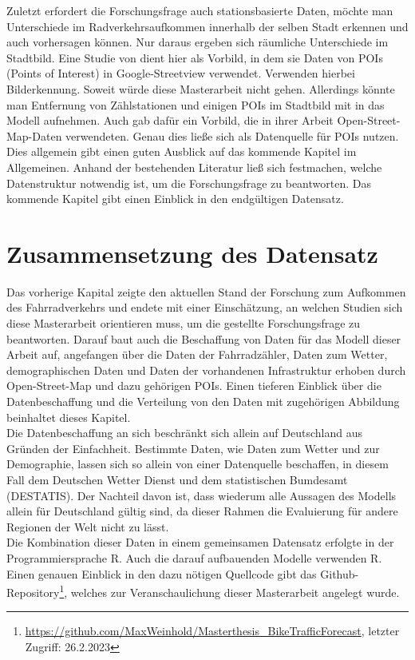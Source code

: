 \documentclass[a4paper,12pt]{thesis}
\begin{document}
Zuletzt erfordert die Forschungsfrage auch stationsbasierte Daten, möchte man Unterschiede im Radverkehrsaufkommen innerhalb der selben Stadt erkennen und auch vorhersagen können. Nur daraus ergeben sich räumliche Unterschiede im Stadtbild. Eine Studie von \cite{HANKEY2021102651} dient hier als Vorbild, in dem sie Daten von POIs (Points of Interest) in Google-Streetview verwendet. \cite{HANKEY2021102651} Verwenden hierbei Bilderkennung. Soweit würde diese Masterarbeit nicht gehen. Allerdings könnte man Entfernung von Zählstationen und einigen POIs im Stadtbild mit in das Modell aufnehmen. Auch \cite{Alattar2021} gab dafür ein Vorbild, die in ihrer Arbeit Open-Street-Map-Daten verwendeten. Genau dies ließe sich als Datenquelle für POIs nutzen. Dies allgemein gibt einen guten Ausblick auf das kommende Kapitel im Allgemeinen. Anhand der bestehenden Literatur ließ sich festmachen, welche Datenstruktur notwendig ist, um die Forschungsfrage zu beantworten. Das kommende Kapitel gibt einen Einblick in den endgültigen Datensatz.

\chapter{Zusammensetzung des Datensatz}\label{Datensatz}

Das vorherige Kapital zeigte den aktuellen Stand der Forschung zum Aufkommen des Fahrradverkehrs und endete mit einer Einschätzung, an welchen Studien sich diese Masterarbeit orientieren muss, um die gestellte Forschungsfrage zu beantworten. Darauf baut auch die Beschaffung von Daten für das Modell dieser Arbeit auf, angefangen über die Daten der Fahrradzähler, Daten zum Wetter, demographischen Daten und Daten der vorhandenen Infrastruktur erhoben durch Open-Street-Map und dazu gehörigen POIs. Einen tieferen Einblick über die Datenbeschaffung und die Verteilung von den Daten mit zugehörigen Abbildung beinhaltet dieses Kapitel.\\
Die Datenbeschaffung an sich beschränkt sich allein auf Deutschland aus Gründen der Einfachheit. Bestimmte Daten, wie Daten zum Wetter und zur Demographie, lassen sich so allein von einer Datenquelle beschaffen, in diesem Fall dem Deutschen Wetter Dienst und dem statistischen Bumdesamt (DESTATIS). Der Nachteil davon ist, dass wiederum alle Aussagen des Modells allein für Deutschland gültig sind, da dieser Rahmen die Evaluierung für andere Regionen der Welt nicht zu lässt.\\
Die Kombination dieser Daten in einem gemeinsamen Datensatz erfolgte in der Programmiersprache R. Auch die darauf aufbauenden Modelle verwenden R. Einen genauen Einblick in den dazu nötigen Quellcode gibt das Github-Repository\footnote{\url{https://github.com/MaxWeinhold/Masterthesis_BikeTrafficForecast}, letzter Zugriff: 26.2.2023}, welches zur Veranschaulichung dieser Masterarbeit angelegt wurde.
\end{document}
